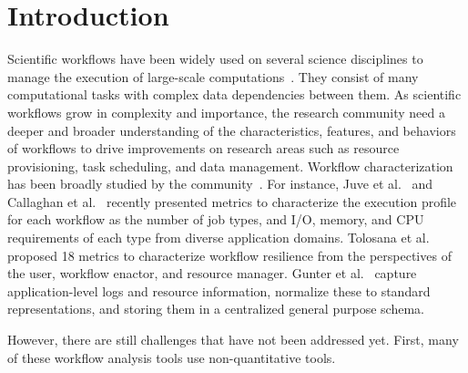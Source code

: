 
\section{Introduction}
\label{intro}

Scientific workflows have been widely used on several science disciplines to manage the execution of large-scale computations~\cite{Deelman2002,Sakellariou2010,Lathers2006,Oinn2004,Wieczorek2005,Maechling2007}. They consist of many computational tasks with complex data dependencies between them. As scientific workflows grow in complexity and importance, the research community need a deeper and broader understanding of the characteristics, features, and behaviors of workflows to drive improvements on research areas such as resource provisioning, task scheduling, and data management. 
Workflow characterization has been broadly studied by the community~\cite{Juve2013, Calasanz2008, Tolosana2011, Callaghan2011, Gunter2011, Yildiz2009, Ramakrishnan2008, Bharathi2008, Gu2013}. For instance, 
Juve et al.~\cite{Juve2013} and Callaghan et al.~\cite{Callaghan2011} recently presented metrics to characterize the execution profile for each workflow as the number of job types, and I/O, memory, and CPU requirements of each type from diverse application domains. Tolosana et al.~\cite{Tolosana2011} proposed 18 metrics to characterize workflow resilience from the perspectives of the user, workflow enactor, and resource manager. Gunter et al.~\cite{Gunter2011} capture application-level logs and resource information, normalize these to standard representations, and storing them in a centralized general purpose schema.

However, there are still challenges that have not been addressed yet. First, many of these workflow analysis tools use non-quantitative tools.

